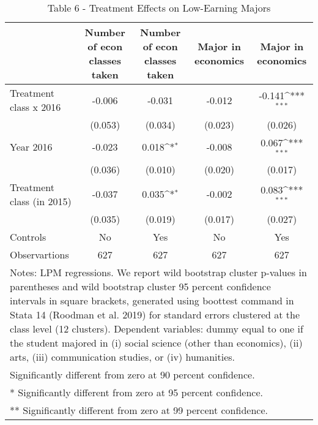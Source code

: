 \begin{table}[]
\caption{Table 6 - Treatment Effects on Low-Earning Majors}
{
\def\sym#1{\ifmmode^{#1}\else\(^{#1}\)\fi}
\begin{tabular}{@{\extracolsep{2pt}}l*{4}{c}@{}}
\hline\hline


 & Number of econ classes taken & Number of econ classes taken & Major in economics & Major in economics \\
\hline
Treatment class x 2016 & -0.006 & -0.031 & -0.012 & -0.141\sym{***} \\
 & (0.053) & (0.034) & (0.023) & (0.026) \\
Year 2016 & -0.023 & 0.018\sym{*} & -0.008 & 0.067\sym{***} \\
 & (0.036) & (0.010) & (0.020) & (0.017) \\
Treatment class (in 2015) & -0.037 & 0.035\sym{*} & -0.002 & 0.083\sym{***} \\
 & (0.035) & (0.019) & (0.017) & (0.027) \\
Controls & No & Yes & No & Yes \\

\hline
Observartions & 627 & 627 & 627 & 627 \\
\hline\hline
\multicolumn{5}{l}{\footnotesize Notes: LPM regressions. We report wild bootstrap cluster p-values in parentheses and wild bootstrap cluster 95 percent                confidence intervals in square brackets, generated using boottest command in Stata 14 (Roodman et al. 2019)                for standard errors clustered at the class level (12 clusters). Dependent variables: dummy equal to one if the student                majored in (i) social science (other than economics), (ii) arts, (iii) communication studies, or (iv) humanities.}\vspace{-.25em} \\
\multicolumn{5}{l}{\footnotesize * Significantly different from zero at 90 percent confidence.}\vspace{-.25em} \\
\multicolumn{5}{l}{\footnotesize ** Significantly different from zero at 95 percent confidence.}\vspace{-.25em} \\
\multicolumn{5}{l}{\footnotesize *** Significantly different from zero at 99 percent confidence.}
\end{tabular}
}
\end{table}